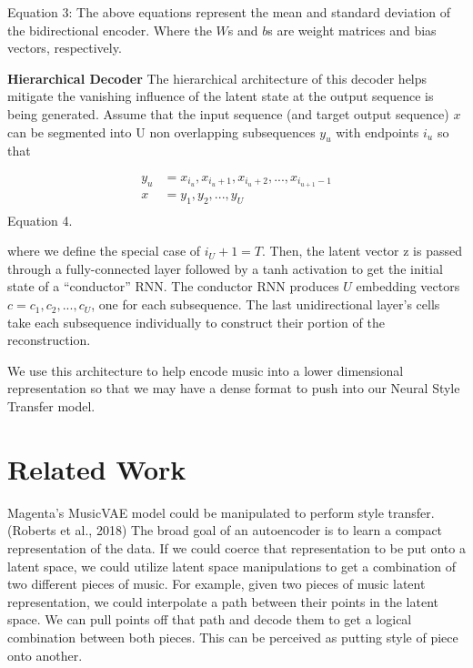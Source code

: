 \documentclass{article}
\begin{document}
Equation 3: The above equations represent the mean and standard deviation of the bidirectional encoder. Where the $W$s and $b$s are weight matrices and bias vectors, respectively. 

\textbf{Hierarchical Decoder} The hierarchical architecture of this decoder helps mitigate the vanishing influence of the latent state at the output sequence is being generated. Assume that the input sequence (and target output sequence) $x$ can be segmented into U non overlapping subsequences $y_u$ with endpoints $i_u$ so that

\begin{equation} 
\begin{split}
y_u & = { x_{i_u} , x_{i_u+1}, x_{i_u+2}, . . . , x_{i_{u+1}-1 } } \\
x & = {y_1, y_2, . . . , y_U } \\
\end{split} 
\end{equation} Equation 4.

where we define the special case of $i_U+1 = T$. Then, the latent vector z is passed through a fully-connected layer followed by a tanh activation to get the initial state of a “conductor” RNN. The conductor RNN produces $U$ embedding vectors $c = {c_1, c_2, . . . , c_U }$, one for each subsequence. The last unidirectional layer's cells take each subsequence individually to construct their portion of the reconstruction. 

We use this architecture to help encode music into a lower dimensional representation so that we may have a dense format to push into our Neural Style Transfer model. 


\section{Related Work}
\label{related}

Magenta's MusicVAE model could be manipulated to perform style transfer.(Roberts et al., 2018) The broad goal of an autoencoder is to learn a compact representation of the data. If we could coerce that representation to be put onto a latent space, we could utilize latent space manipulations to get a combination of two different pieces of music. For example, given two pieces of music latent representation, we could interpolate a path between their points in the latent space. We can pull points off that path and decode them to get a logical combination between both pieces. This can be perceived as putting style of piece onto another. 
\end{document}
